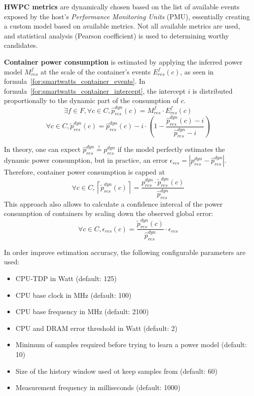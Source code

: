 \textbf{HWPC metrics} are dynamically chosen based on the list of available events exposed by the host's \textit{Performance Monitoring Units} (PMU), essentially creating a custom model based on available metrics. Not all available metrics are used, and statistical analysis (Pearson coefficient) is used to determining worthy candidates.

\textbf{Container power consumption} is estimated by applying the inferred power model $M_{res}^{f}$ at the scale of the container's events $E_{res}^{f}(c)$, as seen in formula~\ref{for:smartwatts_container_events}. In formula~\ref{for:smartwatts_container_intercept}, the intercept $i$ is distributed proportionally to the dynamic part of the consumption of $c$.
\begin{equation}
\label{for:smartwatts_container_events}
    \exists f \in F, \forall c \in C, \hat{p}_{res}^{dyn}(c) = M_{res}^{f} \cdot E_{res}^{f}(c)
\end{equation}
\begin{equation}
\label{for:smartwatts_container_intercept}
    \forall c \in C, \tilde{p}_{res}^{dyn}(c) = \hat{p}_{res}^{dyn}(c) - i \cdot (1-\frac{\hat{p}_{res}^{dyn}(c) -i}{\hat{p}_{res}^{dyn} -i})
\end{equation}

In theory, one can expect $\hat{p}_{res}^{dyn} \overset{!}{=} {p}_{res}^{dyn}$ if the model perfectly estimates the dynamic power consumption, but in practice, an error $\epsilon_{res} = \left| {p}_{res}^{dyn} - \hat{p}_{res}^{dyn} \right|$. Therefore, container power consumption is capped at
\begin{equation}
    \forall c \in C, \left\lceil \tilde{p}_{res}^{dyn}(c) \right\rceil = \frac{{p}_{res}^{dyn} \cdot \tilde{p}_{res}^{dyn}(c)}{\hat{p}_{res}^{dyn}}
\end{equation}
This approach also allows to calculate a confidence intercal of the power consumption of containers by scaling down the observed global error:
\begin{equation}
    \forall c \in C, \epsilon_{res}(c) = \frac{\tilde{p}_{res}^{dyn}(c)}{\hat{p}_{res}^{dyn}} \cdot \epsilon_{res}
\end{equation}

In order improve estimation accuracy, the following configurable parameters are used:
\begin{itemize}
    \item CPU-TDP in Watt (default: 125)
    \item CPU base clock in MHz (default: 100)
    \item CPU base frequency in MHz (default: 2100)
    \item CPU and DRAM error threshold in Watt (default: 2)
    \item Minimum of samples required before trying to learn a power model (default: 10)
    \item Size of the history window used ot keep samples from (default: 60)
    \item Measurement frequency in milliseconds (default: 1000)
\end{itemize}
